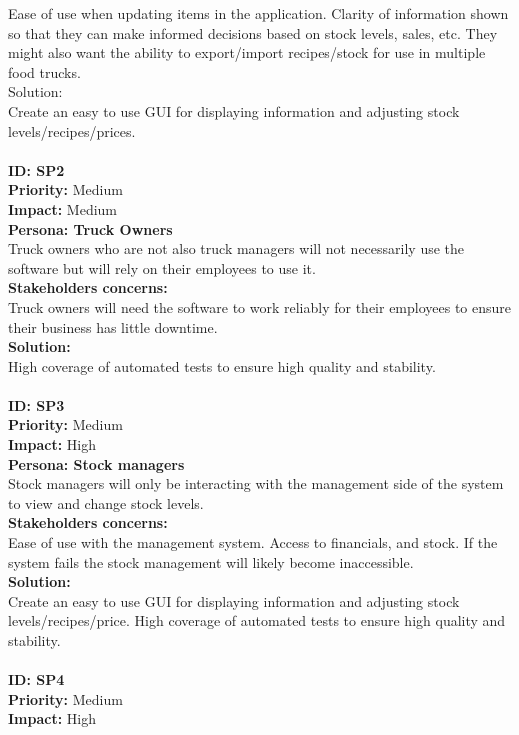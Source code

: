 Ease of use when updating items in the application. Clarity of information shown so that they can make informed decisions based on stock levels, sales, etc. They might also want the ability to export/import recipes/stock for use in multiple food trucks.\\
Solution:\\
Create an easy to use GUI for displaying information and adjusting stock levels/recipes/prices.\\
\\
\textbf{ID: SP2\\}
\textbf{Priority:} Medium\\
\textbf{Impact:} Medium\\
\textbf{Persona: Truck Owners\\}
Truck owners who are not also truck managers will not necessarily use the software but will rely on their employees to use it.\\
\textbf{Stakeholders concerns:\\}
Truck owners will need the software to work  reliably for their employees to ensure their business has little downtime.\\
\textbf{Solution:}\\
High coverage of automated tests to ensure high quality and stability.\\
\\
\textbf{ID: SP3\\}
\textbf{Priority:} Medium\\
\textbf{Impact:} High\\
\textbf{Persona: Stock managers}\\
Stock managers will only be interacting with the management side of the system to view and change stock levels.\\
\textbf{Stakeholders concerns:\\}
Ease of use with the management system. Access to financials, and stock. If the system fails the stock management will likely become inaccessible.\\
\textbf{Solution:\\}
Create an easy to use GUI for displaying information and adjusting stock levels/recipes/price. High coverage of automated tests to ensure high quality and stability.\\
\\
\textbf{ID: SP4\\}
\textbf{Priority:} Medium\\
\textbf{Impact:} High\\
